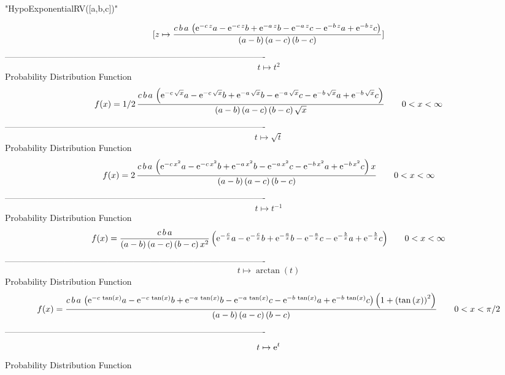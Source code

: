 \documentclass[12pt]{article}
\begin{document}
 
                        "HypoExponentialRV([a,b,c])"

$$[z\mapsto {\frac {c\,b\,a\, \left( {{\rm e}^{-c\,z}}a-{{\rm e}^{-c\,z}
}b+{{\rm e}^{-a\,z}}b-{{\rm e}^{-a\,z}}c-{{\rm e}^{-b\,z}}a+{{\rm e}^{
-b\,z}}c \right) }{ \left( a-b \right)  \left( a-c \right)  \left( b-c
 \right) }}]
$$-------------------------------------------------------------------------------------------  \\$$t\mapsto {t}^{2}
$$Probability Distribution Function 
$$  f(x)=1/2\,{\frac {c\,b\,a\, \left( {{\rm e}^{-c\,\sqrt {x}}}a-{{\rm e}^{-c
\,\sqrt {x}}}b+{{\rm e}^{-a\,\sqrt {x}}}b-{{\rm e}^{-a\,\sqrt {x}}}c-{
{\rm e}^{-b\,\sqrt {x}}}a+{{\rm e}^{-b\,\sqrt {x}}}c \right) }{
 \left( a-b \right)  \left( a-c \right)  \left( b-c \right) \sqrt {x}}
}
 \qquad0
 < x < \infty 
$$-------------------------------------------------------------------------------------------  \\$$t\mapsto \sqrt {t}
$$Probability Distribution Function 
$$  f(x)=2\,{\frac {c\,b\,a\, \left( {{\rm e}^{-c\,{x}^{2}}}a-{{\rm e}^{-c\,{x}
^{2}}}b+{{\rm e}^{-a\,{x}^{2}}}b-{{\rm e}^{-a\,{x}^{2}}}c-{{\rm e}^{-b
\,{x}^{2}}}a+{{\rm e}^{-b\,{x}^{2}}}c \right) x}{ \left( a-b \right) 
 \left( a-c \right)  \left( b-c \right) }}
 \qquad0
 < x < \infty 
$$-------------------------------------------------------------------------------------------  \\$$t\mapsto {t}^{-1}
$$Probability Distribution Function 
$$  f(x)={\frac {c\,b\,a}{ \left( a-b \right)  \left( a-c \right)  \left( b-c
 \right) {x}^{2}} \left( {{\rm e}^{-{\frac {c}{x}}}}a-{{\rm e}^{-{
\frac {c}{x}}}}b+{{\rm e}^{-{\frac {a}{x}}}}b-{{\rm e}^{-{\frac {a}{x}
}}}c-{{\rm e}^{-{\frac {b}{x}}}}a+{{\rm e}^{-{\frac {b}{x}}}}c
 \right) }
 \qquad0
 < x < \infty 
$$-------------------------------------------------------------------------------------------  \\$$t\mapsto \arctan \left( t \right) 
$$Probability Distribution Function 
$$  f(x)={\frac {c\,b\,a\, \left( {{\rm e}^{-c\,\tan \left( x \right) }}a-{
{\rm e}^{-c\,\tan \left( x \right) }}b+{{\rm e}^{-a\,\tan \left( x
 \right) }}b-{{\rm e}^{-a\,\tan \left( x \right) }}c-{{\rm e}^{-b\,
\tan \left( x \right) }}a+{{\rm e}^{-b\,\tan \left( x \right) }}c
 \right)  \left( 1+ \left( \tan \left( x \right)  \right) ^{2}
 \right) }{ \left( a-b \right)  \left( a-c \right)  \left( b-c
 \right) }}
 \qquad0
 < x < \pi/2
$$-------------------------------------------------------------------------------------------  \\$$t\mapsto {{\rm e}^{t}}
$$Probability Distribution Function 
\end{document}
